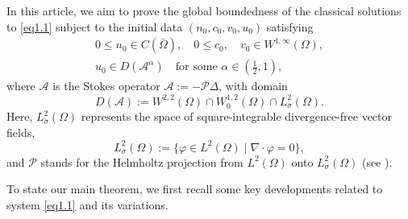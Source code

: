 \documentclass[reqno]{amsart}
\begin{document}
In this article, we aim to prove the global boundedness of the classical solutions 
to \eqref{eq1.1} subject to the initial data $(n_0, c_0, v_0, u_0)$
satisfying
\begin{equation}\label{eq1.3}
\begin{gathered}
0\leq n_0 \in C(\bar{\Omega}), \quad
0\leq c_0 , \quad v_0 \in W^{1, \infty}(\Omega), \\
u_0 \in D(\mathcal{A}^\alpha) \quad \text{for some } 
\alpha \in (\frac{1}{2}, 1),
\end{gathered}
\end{equation}
where $\mathcal{A}$ is the Stokes operator \(\mathcal{A} := -\mathcal{P}\Delta\),
with domain
\[
D(\mathcal{A}) := W^{2,2}(\Omega) \cap W_0^{1,2}(\Omega) \cap L_\sigma^2(\Omega).
\]
Here, \(L_\sigma^2(\Omega)\) represents the space of square-integrable divergence-free 
vector fields, 
\[
L_\sigma^2(\Omega) := \{\varphi \in L^2(\Omega) \mid \nabla \cdot \varphi 
= 0\},
\]
and \(\mathcal{P}\) stands for the Helmholtz projection from 
\(L^2(\Omega)\) onto \(L_\sigma^2(\Omega)\) (see \cite{Sohr-2001}).

To state our main theorem, we first recall some key developments related to
system \eqref{eq1.1} and its variations.
\end{document}
